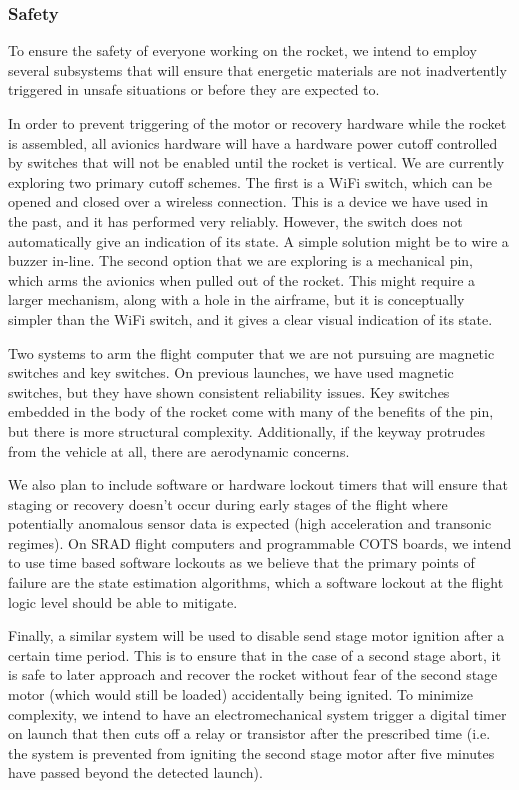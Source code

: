 \subsubsection{Safety}
To ensure the safety of everyone working on the rocket, we intend to employ several subsystems that will ensure that energetic materials are not inadvertently triggered in unsafe situations or before they are expected to.

In order to prevent triggering of the motor or recovery hardware while the rocket is assembled, all avionics hardware will have a hardware power cutoff controlled by switches that will not be enabled until the rocket is vertical. We are currently exploring two primary cutoff schemes. The first is a WiFi switch, which can be opened and closed over a wireless connection. This is a device we have used in the past, and it has performed very reliably. However, the switch does not automatically give an indication of its state. A simple solution might be to wire a buzzer in-line. The second option that we are exploring is a mechanical pin, which arms the avionics when pulled out of the rocket. This might require a larger mechanism, along with a hole in the airframe, but it is conceptually simpler than the WiFi switch, and it gives a clear visual indication of its state.

Two systems to arm the flight computer that we are not pursuing are magnetic switches and key switches. On previous launches, we have used magnetic switches, but they have shown consistent reliability issues. Key switches embedded in the body of the rocket come with many of the benefits of the pin, but there is more structural complexity. Additionally, if the keyway protrudes from the vehicle at all, there are aerodynamic concerns.

We also plan to include software or hardware lockout timers that will ensure that staging or recovery doesn’t occur during early stages of the flight where potentially anomalous sensor data is expected (high acceleration and transonic regimes). On SRAD flight computers and programmable COTS boards, we intend to use time based software lockouts as we believe that the primary points of failure are the state estimation algorithms, which a software lockout at the flight logic level should be able to mitigate.

Finally, a similar system will be used to disable send stage motor ignition after a certain time period. This is to ensure that in the case of a second stage abort, it is safe to later approach and recover the rocket without fear of the second stage motor (which would still be loaded) accidentally being ignited. To minimize complexity, we intend to have an electromechanical system trigger a digital timer on launch that then cuts off a relay or transistor after the prescribed time (i.e. the system is prevented from igniting the second stage motor after five minutes have passed beyond the detected launch).



